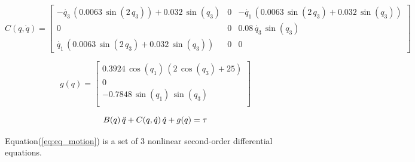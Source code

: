 \documentclass{article}
\begin{document}
\begin{equation}
    C(q, \dot{q}) = \begin{bmatrix}
        -\dot{q_3}\,(0.0063\,\sin(2\,q_3)) + 0.032\,\sin(q_3) & 0 & -\dot{q_1}\,(0.0063\,\sin(2\,q_3) + 0.032\,\sin(q_3)) \\
        0                                                     & 0 & 0.08\,\dot{q_3}\,\sin(q_3)                            \\
        \dot{q_1}\,(0.0063\,\sin(2\,q_3) + 0.032\,\sin(q_3))  & 0 & 0
    \end{bmatrix}
    \label{eq:dynamics_C}
\end{equation}


\begin{equation}
    g(q) = \begin{bmatrix}
        0.3924\,\cos(q_1)\,(2\,\cos(q_3) + 25) \\
        0                                      \\
        -0.7848\,\sin(q_1)\,\sin(q_3)          \\
    \end{bmatrix}
    \label{eq:dynamics_G}
\end{equation}

\begin{equation}
    B(q)\,\ddot{q} + C(q, \dot{q})\,\dot{q} + g(q) = \tau \\
    \label{eq:eq_motion}
\end{equation}

Equation(\ref{eq:eq_motion}) is a set of 3 nonlinear second-order differential equations.

\end{document}

